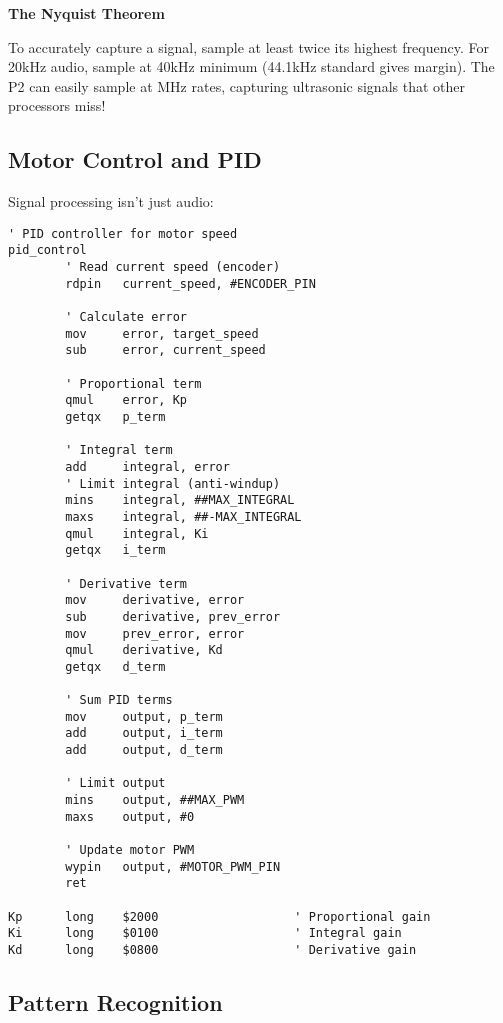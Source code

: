 \documentclass[11pt]{book}
\begin{document}
\begin{interlude}
\textbf{The Nyquist Theorem}

To accurately capture a signal, sample at least twice its highest frequency. For 20kHz audio, sample at 40kHz minimum (44.1kHz standard gives margin). The P2 can easily sample at MHz rates, capturing ultrasonic signals that other processors miss!
\end{interlude}

\hypertarget{motor-control-and-pid}{%
\subsection{Motor Control and PID}\label{motor-control-and-pid}}

Signal processing isn't just audio:

\begin{lstlisting}
' PID controller for motor speed
pid_control
        ' Read current speed (encoder)
        rdpin   current_speed, #ENCODER_PIN
        
        ' Calculate error
        mov     error, target_speed
        sub     error, current_speed
        
        ' Proportional term
        qmul    error, Kp
        getqx   p_term
        
        ' Integral term
        add     integral, error
        ' Limit integral (anti-windup)
        mins    integral, ##MAX_INTEGRAL
        maxs    integral, ##-MAX_INTEGRAL
        qmul    integral, Ki
        getqx   i_term
        
        ' Derivative term
        mov     derivative, error
        sub     derivative, prev_error
        mov     prev_error, error
        qmul    derivative, Kd
        getqx   d_term
        
        ' Sum PID terms
        mov     output, p_term
        add     output, i_term
        add     output, d_term
        
        ' Limit output
        mins    output, ##MAX_PWM
        maxs    output, #0
        
        ' Update motor PWM
        wypin   output, #MOTOR_PWM_PIN
        ret
        
Kp      long    $2000                   ' Proportional gain
Ki      long    $0100                   ' Integral gain
Kd      long    $0800                   ' Derivative gain
\end{lstlisting}

\hypertarget{pattern-recognition}{%
\subsection{Pattern Recognition}\label{pattern-recognition}}
\end{document}
